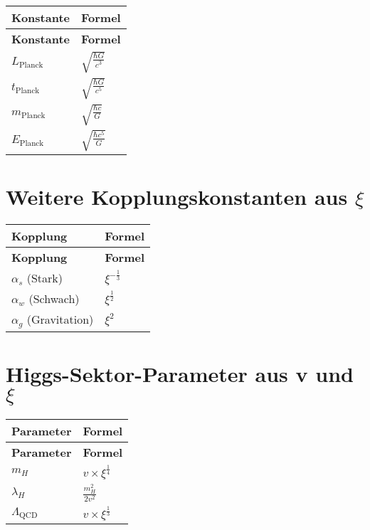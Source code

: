 \documentclass[12pt,a4paper]{article}
\begin{document}
	\begin{longtable}{|p{3cm}|p{4cm}|}
		\hline
		\textbf{Konstante} & \textbf{Formel} \\
		\hline
		\endfirsthead
		\hline
		\textbf{Konstante} & \textbf{Formel} \\
		\hline
		\endhead
		\(L_{\text{Planck}}\) & \(\sqrt{\frac{\hbar G}{c^{3}}}\) \\
		\hline
		\(t_{\text{Planck}}\) & \(\sqrt{\frac{\hbar G}{c^{5}}}\) \\
		\hline
		\(m_{\text{Planck}}\) & \(\sqrt{\frac{\hbar c}{G}}\) \\
		\hline
		\(E_{\text{Planck}}\) & \(\sqrt{\frac{\hbar c^{5}}{G}}\) \\
		\hline
	\end{longtable}
	
	\section{Weitere Kopplungskonstanten aus \(\xi\)}
	
	\begin{longtable}{|p{3cm}|p{3cm}|}
		\hline
		\textbf{Kopplung} & \textbf{Formel} \\
		\hline
		\endfirsthead
		\hline
		\textbf{Kopplung} & \textbf{Formel} \\
		\hline
		\endhead
		\(\alpha_s\) (Stark) & \(\xi^{-\frac{1}{3}}\) \\
		\hline
		\(\alpha_w\) (Schwach) & \(\xi^{\frac{1}{2}}\) \\
		\hline
		\(\alpha_g\) (Gravitation) & \(\xi^{2}\) \\
		\hline
	\end{longtable}
	
	\section{Higgs-Sektor-Parameter aus v und \(\xi\)}
	
	\begin{longtable}{|p{3cm}|p{4cm}|}
		\hline
		\textbf{Parameter} & \textbf{Formel} \\
		\hline
		\endfirsthead
		\hline
		\textbf{Parameter} & \textbf{Formel} \\
		\hline
		\endhead
		\(m_H\) & \(v \times \xi^{\frac{1}{4}}\) \\
		\hline
		\(\lambda_H\) & \(\frac{m_H^{2}}{2v^{2}}\) \\
		\hline
		\(\Lambda_{\text{QCD}}\) & \(v \times \xi^{\frac{1}{3}}\) \\
		\hline
	\end{longtable}
	
\end{document}
